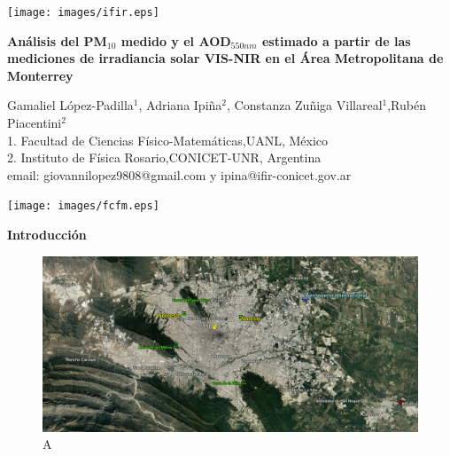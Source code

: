 \documentclass{article}
\begin{document}
\vspace*{-2cm}
\changefontsizes{14pt}
\hspace*{-1cm}
\begin{minipage}{0.2\linewidth}
\vspace{0.7cm}
\vspace*{-0.15cm}
\texttt{[image: images/ifir.eps]}
\end{minipage}
\vspace*{-0.4cm}
\begin{minipage}{0.6\linewidth}
\vspace*{0.7cm}
\begin{center}
\changefontsizes{15pt}
\hspace*{-0.1cm}
\textbf{\textcolor{title}{Análisis del PM$_{10}$ medido y el AOD$_{550nm}$ estimado a partir de las mediciones de irradiancia solar VIS-NIR en el Área Metropolitana de Monterrey}}
\end{center}
\vspace{-1cm}
\begin{center}
\changefontsizes{11pt}
Gamaliel López-Padilla$^1$, Adriana Ipiña$^{2}$, Constanza Zuñiga Villareal$^{1}$,Rubén Piacentini$^{2}$\\
1. Facultad de Ciencias Físico-Matemáticas,UANL, México\\
2. Instituto de Física Rosario,CONICET-UNR, Argentina\\
email: giovannilopez9808@gmail.com y ipina@ifir-conicet.gov.ar
\end{center}
\end{minipage}
\begin{minipage}{0.2\linewidth}
\hspace*{0.2cm}
\texttt{[image: images/fcfm.eps]}
\end{minipage}
\vspace{0.2cm}
\changefontsizes{12pt}
\begin{center}
\begin{shaded}
\textbf{\textcolor{ver}{Introducción}}
\end{shaded}
\end{center}
\begin{minipage}{0.47\linewidth}
\begin{figure}[H]
\centering
\includegraphics[scale=0.101]{images/satelite.jpg}
\caption{A}
\end{figure}
\end{minipage}
\end{document}
